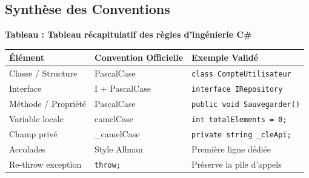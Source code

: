 \subsection{Synthèse des Conventions}

\begin{center}
    \textbf{Tableau : Tableau récapitulatif des règles d'ingénierie C\#} \\[0.3cm]
    \begin{tabular}{@{}lll@{}}
        \toprule
        \textbf{Élément} & \textbf{Convention Officielle} & \textbf{Exemple Validé} \\
        \midrule
        Classe / Structure & PascalCase & \texttt{class CompteUtilisateur} \\
        Interface & I + PascalCase & \texttt{interface IRepository} \\
        Méthode / Propriété & PascalCase & \texttt{public void Sauvegarder()} \\
        Variable locale & camelCase & \texttt{int totalElements = 0;} \\
        Champ privé & \_camelCase & \texttt{private string \_cleApi;} \\
        Accolades & Style Allman & Première ligne dédiée \\
        Re-throw exception & \texttt{throw;} & Préserve la pile d'appels \\
        \bottomrule
    \end{tabular}
\end{center}
